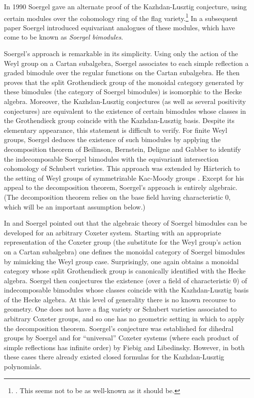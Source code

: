 \documentclass[11pt]{amsart}
\numberwithin{equation}{section}
\theoremstyle{definition}
\theoremstyle{remark}
\begin{document}
In 1990 Soergel \cite{S1} gave an alternate proof of the
Kazhdan-Lusztig conjecture, using certain modules over the cohomology
ring of the flag variety.\footnote{\cite[\S1.1, Bermerkung
  5]{S1}. This seems not to be as well-known as it should be.} In a subsequent
paper \cite{S2} Soergel introduced equivariant analogues of these modules, which have come to be known as \emph{Soergel bimodules}.

Soergel's approach is remarkable in its simplicity. Using only the action of the Weyl group on a Cartan subalgebra, Soergel associates to each simple reflection a graded bimodule over the
regular functions on the Cartan subalgebra. He then proves that the split Grothendieck
group of the monoidal category generated by these 
bimodules (the category of Soergel bimodules) is isomorphic to the
Hecke algebra. Moreover, the Kazhdan-Lusztig conjectures (as well as
several positivity conjectures) are equivalent to 
the existence of certain bimodules whose classes in the Grothendieck
group coincide with the Kazhdan-Lusztig basis. Despite its elementary
appearance, this statement is difficult to 
verify. For finite Weyl groups, Soergel deduces the existence of such bimodules by
applying the decomposition theorem of Beilinson, Bernstein, Deligne
and Gabber \cite{BBD} to 
identify the indecomposable Soergel bimodules with the equivariant
intersection cohomology of Schubert varieties. This approach was
extended by H\"arterich to the setting of Weyl groups of
symmetrizable Kac-Moody groups \cite{Ha}.  Except for his appeal
to the decomposition theorem, Soergel's approach is entirely
algebraic. (The decomposition theorem relies on the base field having characteristic 0, which will be an important assumption below.)

In \cite{S2} and \cite{S3} Soergel pointed out that the algebraic
theory of Soergel bimodules can be developed for an arbitrary Coxeter
system. Starting with an 
appropriate representation of the Coxeter group (the substitute for
the Weyl group's action on a Cartan subalgebra) one defines the
monoidal category of 
Soergel bimodules by mimicking the Weyl group case. Surprisingly, one
again obtains a monoidal category whose split Grothendieck group is
canonically identified with the Hecke algebra. 
Soergel then conjectures the existence (over a field of characteristic
0) of indecomposable bimodules whose classes coincide with the
Kazhdan-Lusztig basis of the Hecke algebra. At this level of
generality there is no known recourse to geometry. One does not
have a flag variety or Schubert varieties associated to arbitrary
Coxeter groups, and so one has no geometric setting in which to apply
the decomposition theorem. Soergel's conjecture was established for
dihedral groups by Soergel \cite{S2} and for ``universal'' Coxeter systems
(where each product of simple reflections has infinite order) by
Fiebig \cite{Funiv} and Libedinsky. However, in both these cases there
already existed closed formulas for the Kazhdan-Lusztig polynomials.
\end{document}

